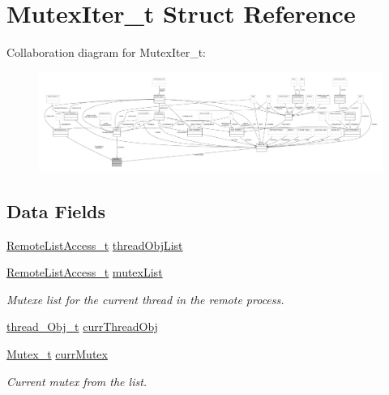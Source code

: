\hypertarget{struct_mutex_iter__t}{}\section{Mutex\+Iter\+\_\+t Struct Reference}
\label{struct_mutex_iter__t}


Collaboration diagram for Mutex\+Iter\+\_\+t\+:
\nopagebreak
\begin{figure}[H]
\begin{center}
\leavevmode
\includegraphics[width=350pt]{struct_mutex_iter__t__coll__graph}
\end{center}
\end{figure}
\subsection*{Data Fields}
\begin{DoxyCompactItemize}
\item 
\hyperlink{struct_remote_list_access__t}{Remote\+List\+Access\+\_\+t} \hyperlink{struct_mutex_iter__t_ae8248a98b57faad0385f542390bcf32e}{thread\+Obj\+List}
\item 
\hyperlink{struct_remote_list_access__t}{Remote\+List\+Access\+\_\+t} \hyperlink{struct_mutex_iter__t_a1649f4f2371f6fd4e47455343b99a001}{mutex\+List}
\begin{DoxyCompactList}\small\item\em Mutexe list for the current thread in the remote process. \end{DoxyCompactList}\item 
\hyperlink{structthread___obj__t}{thread\+\_\+\+Obj\+\_\+t} \hyperlink{struct_mutex_iter__t_ad74a6a57c574765d3c1970fd2104186a}{curr\+Thread\+Obj}
\item 
\hyperlink{struct_mutex__t}{Mutex\+\_\+t} \hyperlink{struct_mutex_iter__t_a86753027db44dd235b1efe5f64e66034}{curr\+Mutex}
\begin{DoxyCompactList}\small\item\em Current mutex from the list. \end{DoxyCompactList}\end{DoxyCompactItemize}


